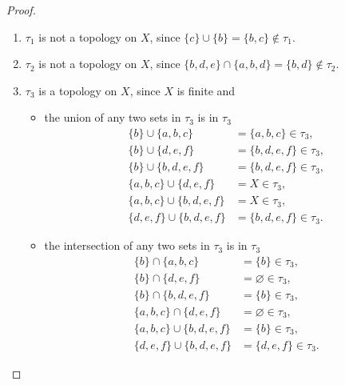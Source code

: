 \begin{proof}
    \begin{enumerate}[label={(\alph*)}]
        \item $\tau_{1}$ is not a topology on $X$, since $\{ c \}\cup\{ b \} = \{ b, c \}\notin \tau_{1}$.
        \item $\tau_{2}$ is not a topology on $X$, since $\{ b, d, e \}\cap \{ a, b, d \} = \{ b, d \}\notin\tau_{2}$.
        \item $\tau_{3}$ is a topology on $X$, since $X$ is finite and
              \begin{itemize}
                  \item the union of any two sets in $\tau_{3}$ is in $\tau_{3}$
                        \begin{align*}
                            \{ b \} \cup \{ a, b, c \}          & = \{ a, b, c \}\in \tau_{3},    \\
                            \{ b \} \cup \{ d, e, f \}          & = \{ b, d, e, f \}\in \tau_{3}, \\
                            \{ b \} \cup \{ b, d, e, f \}       & = \{ b, d, e, f \}\in \tau_{3}, \\
                            \{ a, b, c \} \cup \{ d, e, f \}    & = X\in \tau_{3},                \\
                            \{ a, b, c \} \cup \{ b, d, e, f \} & = X\in \tau_{3},                \\
                            \{ d, e, f \} \cup \{ b, d, e, f \} & = \{ b, d, e, f \}\in \tau_{3}.
                        \end{align*}
                  \item the intersection of any two sets in $\tau_{3}$ is in $\tau_{3}$
                        \begin{align*}
                            \{ b \} \cap \{ a, b, c \}          & = \{ b \}\in \tau_{3},       \\
                            \{ b \} \cap \{ d, e, f \}          & = \varnothing\in \tau_{3},   \\
                            \{ b \} \cap \{ b, d, e, f \}       & = \{ b \}\in \tau_{3},       \\
                            \{ a, b, c \} \cap \{ d, e, f \}    & = \varnothing\in \tau_{3},   \\
                            \{ a, b, c \} \cup \{ b, d, e, f \} & = \{ b \}\in \tau_{3},       \\
                            \{ d, e, f \} \cup \{ b, d, e, f \} & = \{ d, e, f \}\in \tau_{3}.
                        \end{align*}
              \end{itemize}
    \end{enumerate}
\end{proof}
\newpage


